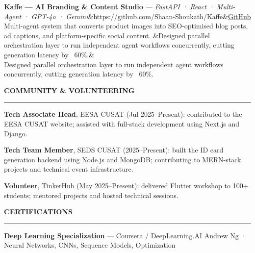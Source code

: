 \documentclass[10.8pt, a4paper]{article}
\newcommand{\cvsection}[1]{%
  \vspace{7pt}%
  {\color{accent}\textbf{\MakeUppercase{#1}}}\\[-5pt]
  {\color{rulecol}\rule{\linewidth}{0.5pt}}%
  \vspace{2pt}%
}
\newcommand{\project}[5]{%
  \textbf{#1} {\small\color{subtle}\textit{— #2}}\ifx&#5&\else\hfill{\small\href{#5}{\textcolor{accent}{GitHub}}}\fi\\
  {\small #3}%
  \ifx&#4&\else\\ {\small #4}\fi%
}
\begin{document}
\vspace{4pt}
\project{Kaffe — AI Branding \& Content Studio}{FastAPI · React · Multi-Agent · GPT-4o · Gemini}%
        {Multi-agent system that converts product images into SEO-optimised blog posts, ad captions, and platform-specific social content.}%
        {Designed parallel orchestration layer to run independent agent workflows concurrently, cutting generation latency by ~60\%.}%
        {https://github.com/Shaan-Shoukath/Kaffe}

\cvsection{Community \& Volunteering}
{\small\textbf{Tech Associate Head}, EESA CUSAT (Jul 2025–Present): contributed to the EESA CUSAT website; assisted with full-stack development using Next.js and Django.}

\vspace{4pt}
{\small\textbf{Tech Team Member}, SEDS CUSAT (2025–Present): built the ID card generation backend using Node.js and MongoDB; contributing to MERN-stack projects and technical event infrastructure.}

\vspace{4pt}
{\small\textbf{Volunteer}, TinkerHub (May 2025–Present): delivered Flutter workshop to 100+ students; mentored projects and hosted technical sessions.}

\cvsection{Certifications}
{\small\href{https://www.coursera.org/account/accomplishments/specialization/D2GSDEZHMNFZ}{\textbf{Deep Learning Specialization}} — Coursera / DeepLearning.AI \hfill {\color{subtle}Andrew Ng · Neural Networks, CNNs, Sequence Models, Optimization}}
\end{document}
